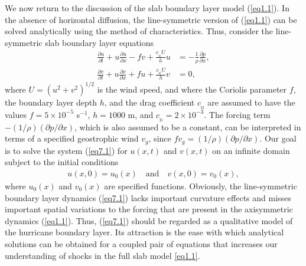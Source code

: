 \documentclass[10pt]{article}
\newcommand{\cD}{c_{_\mathrm{D}}}
\begin{document}
     We now return to the discussion of the slab boundary layer model
(\ref{eq1.1}). In the absence of horizontal diffusion, the line-symmetric
version of (\ref{eq1.1}) can be solved analytically using the method of
characteristics. Thus, consider the line-symmetric slab boundary layer equations
\begin{equation}                                  %
  \begin{split}
     \frac{\partial u}{\partial t} + u\frac{\partial u}{\partial x}
            - fv + \frac{\cD U}{h}u &= -\frac{1}{\rho}\frac{\partial p}{\partial x},  \\
     \frac{\partial v}{\partial t} + u\frac{\partial v}{\partial x}
            + fu + \frac{\cD U}{h}v &= 0,
  \end{split}
\label{eq7.1}
\end{equation}
where $U=(u^2+v^2)^{1/2}$ is the wind speed, and where the Coriolis parameter $f$, the
boundary layer depth $h$, and the drag coefficient $\cD$ are assumed to have the
values $f=5\times 10^{-5}$ s$^{-1}$, $h=1000$ m, and $\cD=2\times 10^{-3}$. The forcing
term $-(1/\rho)(\partial p/\partial x)$, which is also assumed to be a constant, can
be interpreted in terms of a specified geostrophic wind $v_g$, since
$fv_g=(1/\rho)(\partial p/\partial x)$.  Our goal is to solve the system (\ref{eq7.1})
for $u(x,t)$ and $v(x,t)$ on an infinite domain subject to the initial conditions
\begin{equation}                                  %
  \begin{split}
        u(x,0) = u_0(x)  \quad \text{and} \quad  v(x,0) = v_0(x),
  \end{split}
\label{eq7.2}
\end{equation}
where $u_0(x)$ and $v_0(x)$ are specified functions. Obviously, the line-symmetric
boundary layer dynamics (\ref{eq7.1}) lacks important curvature effects and misses
important spatial variations to the forcing that are
present in the axisymmetric dynamics (\ref{eq1.1}). Thus, (\ref{eq7.1}) should
 be regarded as a qualitative model of the hurricane boundary layer. Its
attraction is the ease with which analytical solutions can be obtained
for a coupled pair of equations that increases our understanding of shocks in the
full slab model \eqref{eq1.1}.
\end{document}
